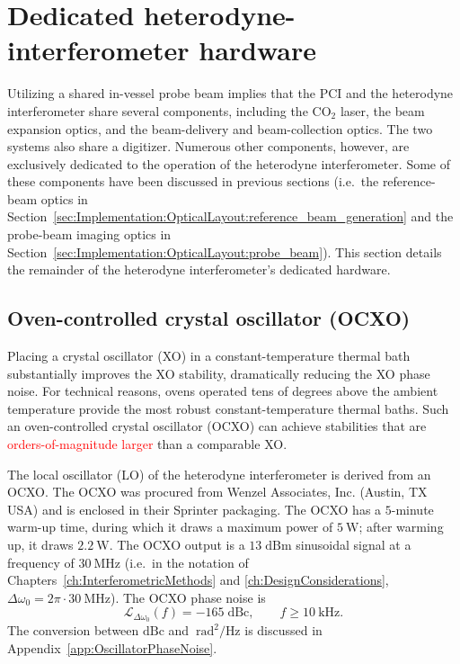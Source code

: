 \section{Dedicated heterodyne-interferometer hardware}
\label{sec:Implementation:Hardware}
\graffito{\textcolor{red}{laser parameters?}}
Utilizing a shared in-vessel probe beam implies that
the PCI and the heterodyne interferometer share several components,
including the CO$_2$ laser,
the beam expansion optics, and
the beam-delivery and beam-collection optics.
\graffito{\textcolor{red}{digitizer parameters?}}
The two systems also share a digitizer.
Numerous other components, however,
are exclusively dedicated to the operation
of the heterodyne interferometer.
Some of these components have been discussed in previous sections
(i.e.\ the reference-beam optics
in Section~\ref{sec:Implementation:OpticalLayout:reference_beam_generation}
and the probe-beam imaging optics
in Section~\ref{sec:Implementation:OpticalLayout:probe_beam}).
This section details the remainder
of the heterodyne interferometer's dedicated hardware.


\subsection{Oven-controlled crystal oscillator (OCXO)}
\label{sec:Implementation:Hardware:OCXO}
\graffito{\textcolor{red}{cite AoE?}}
Placing a crystal oscillator (XO) in a constant-temperature thermal bath
substantially improves the XO stability,
dramatically reducing the XO phase noise.
For technical reasons,
ovens operated tens of degrees above the ambient temperature
provide the most robust constant-temperature thermal baths.
Such an oven-controlled crystal oscillator (OCXO)
can achieve stabilities that are \textcolor{red}{orders-of-magnitude larger}
than a comparable XO.

The local oscillator (LO) of the heterodyne interferometer
is derived from an OCXO.
The OCXO was procured from Wenzel Associates, Inc. (Austin, TX USA)
and is enclosed in their Sprinter packaging.
The OCXO has a $5$-minute warm-up time,
during which it draws a maximum power of $\SI{5}{\watt}$;
after warming up, it draws $\SI{2.2}{\watt}$.
The OCXO output is a $13 \; \text{dBm}$ sinusoidal signal
at a frequency of $\SI{30}{\mega\hertz}$
(i.e.\ in the notation of
Chapters~\ref{ch:InterferometricMethods} and \ref{ch:DesignConsiderations},
$\Delta \omega_0 = 2 \pi \cdot \SI{30}{\mega\hertz}$).
The OCXO phase noise is
\begin{equation}
    \mathcal{L}_{\Delta \omega_0}(f)
    =
    -165 \; \text{dBc},
    \qquad
    f \geq \SI{10}{\kilo\hertz}.
  \label{eq:Implementation:OCXO_phase_noise}
\end{equation}
The conversion between $\text{dBc}$ and
$\SI{}{\radian\squared\per\hertz}$ is discussed
in Appendix~\ref{app:OscillatorPhaseNoise}.

